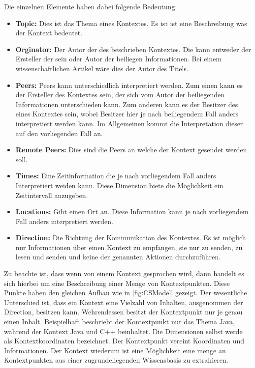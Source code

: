 \documentclass[a4paper]{article}
\begin{document}
	Die einzelnen Elemente haben dabei folgende Bedeutung:
	\begin{itemize}
		\item \textbf{Topic:} Dies ist das Thema eines Kontextes. Es ist ist eine
		Beschreibung was der Kontext bedeutet.
		\item \textbf{Orginator:} Der Autor der des beschrieben Kontextes. Die
		kann entweder der Ersteller der sein oder Autor der beiliegen
		Informationen. Bei einem wissenschaftlichen Artikel wäre dies der Autor
		des Titels.
		\item \textbf{Peers:} Peers kann unterschiedlich interpretiert werden.
		Zum einen kann es der Ersteller des Kontextes sein, der sich vom Autor
		der beiliegenden Informationen unterschieden kann. Zum anderen kann es
		der Besitzer des eines Kontextes sein, wobei Besitzer hier je nach 
		beiliegendem Fall anders interpretiert werden kann. Im Allgemeinen
		kommt die Interpretation dieser auf den vorliegenden Fall an.
		\item \textbf{Remote Peers:} Dies sind die Peers an welche der Kontext
		gesendet werden soll.
		\item \textbf{Times:} Eine Zeitinformation die je nach vorliegendem Fall
		anders Interpretiert weiden kann. Diese Dimension biete die Möglichkeit
		ein Zeitintervall anzugeben.
		\item \textbf{Locations:} Gibt einen Ort an. Diese Information kann je
		nach vorliegendem Fall anders interpretiert werden.
		\item \textbf{Direction:} Die Richtung der Kommunikation des Kontextes.
		Es ist möglich nur Informationen über einen Kontext zu empfangen, sie nur
		zu senden, zu lesen und senden und keine der genannten Aktionen
		durchzuführen.
	\end{itemize} 	
	
	Zu beachte ist, dass wenn von einem Kontext gesprochen wird, dann handelt es
	sich hierbei um eine Beschreibung einer Menge von Kontextpunkten. Diese
	Punkte haben den gleichen Aufbau wie in \autoref{fig:CSModel} gezeigt. Der 
	wesentliche Unterschied ist, dass ein Kontext eine Vielzahl von Inhalten,
	ausgenommen der Direction, besitzen kann. Wehrendessen besitzt der
	Kontextpunkt nur je genau einen Inhalt. Beispielhaft beschriebt der
	Kontextpunkt nur das Thema Java, während der Kontext Java und C++ beinhaltet.
	Die Dimensionen selbst werde als Kontextkoordinaten bezeichnet. Der 
	Kontextpunkt vereint Koordinaten und Informationen. Der Kontext wiederum
	ist eine Möglichkeit eine menge an Kontextpunkten aus einer zugrundeliegenden
	Wissensbasis zu extrahieren.
	
\end{document}
